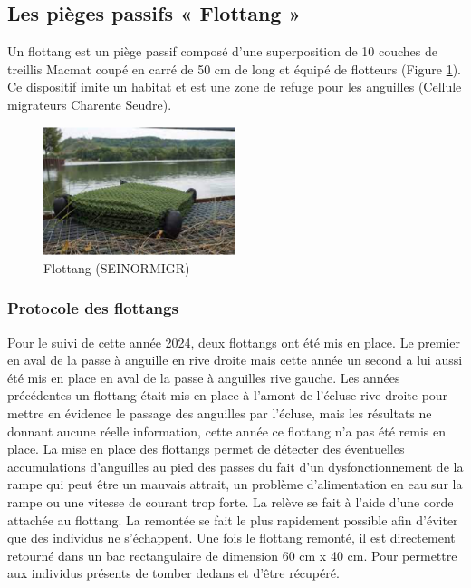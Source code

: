 \documentclass[11pt,titlepage,twoside]{article}\usepackage[]{graphicx}\usepackage[table]{xcolor}
\begin{document}
\subsection{Les pièges passifs « Flottang »}

Un flottang est un piège passif composé d’une superposition de 10 couches de treillis Macmat coupé en carré de 50 cm de long et équipé de flotteurs (Figure \ref{Flottang}). Ce dispositif imite un habitat et est une zone de refuge pour les anguilles (Cellule migrateurs Charente Seudre).

\begin{figure}[htpb]
\centering
\includegraphics[width=0.5\textwidth]{Flottang}
\caption{Flottang (SEINORMIGR)}
\label{Flottang}
\end{figure}

\subsubsection{Protocole des flottangs}

Pour le suivi de cette année 2024, deux flottangs ont été mis en place. Le premier en aval de la passe à anguille en rive droite mais cette année un second a lui aussi été mis en place en aval de la passe à anguilles rive gauche. Les années précédentes un flottang était mis en place à l’amont de l’écluse rive droite pour mettre en évidence le passage des anguilles par l’écluse, mais les résultats ne donnant aucune réelle information, cette année ce flottang n’a pas été remis en place. La mise en place des flottangs permet de détecter des éventuelles accumulations d’anguilles au pied des passes du fait d’un dysfonctionnement de la rampe qui peut être un mauvais attrait, un problème d’alimentation en eau sur la rampe ou une vitesse de courant trop forte. La relève se fait à l’aide d’une corde attachée au flottang. La remontée se fait le plus rapidement possible afin d’éviter que des individus ne s’échappent. Une fois le flottang remonté, il est directement retourné dans un bac rectangulaire de dimension 60 cm x 40 cm. Pour permettre aux individus présents de tomber dedans et d’être récupéré. 
\end{document}
